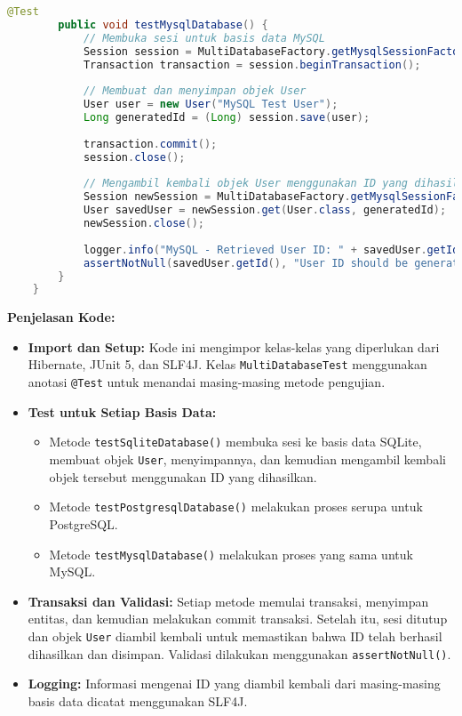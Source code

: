 \begin{lstlisting}[language=Java, style=JavaStyle]
		@Test
		public void testMysqlDatabase() {
			// Membuka sesi untuk basis data MySQL
			Session session = MultiDatabaseFactory.getMysqlSessionFactory().openSession();
			Transaction transaction = session.beginTransaction();
			
			// Membuat dan menyimpan objek User
			User user = new User("MySQL Test User");
			Long generatedId = (Long) session.save(user);
			
			transaction.commit();
			session.close();
			
			// Mengambil kembali objek User menggunakan ID yang dihasilkan
			Session newSession = MultiDatabaseFactory.getMysqlSessionFactory().openSession();
			User savedUser = newSession.get(User.class, generatedId);
			newSession.close();
			
			logger.info("MySQL - Retrieved User ID: " + savedUser.getId());
			assertNotNull(savedUser.getId(), "User ID should be generated in MySQL");
		}
	}
\end{lstlisting}

\textbf{Penjelasan Kode:}
\begin{itemize}
	\item \textbf{Import dan Setup:} Kode ini mengimpor kelas-kelas yang diperlukan dari Hibernate, JUnit 5, dan SLF4J. Kelas \texttt{MultiDatabaseTest} menggunakan anotasi \texttt{@Test} untuk menandai masing-masing metode pengujian.
	\item \textbf{Test untuk Setiap Basis Data:} 
	\begin{itemize}
		\item Metode \texttt{testSqliteDatabase()} membuka sesi ke basis data SQLite, membuat objek \texttt{User}, menyimpannya, dan kemudian mengambil kembali objek tersebut menggunakan ID yang dihasilkan.
		\item Metode \texttt{testPostgresqlDatabase()} melakukan proses serupa untuk PostgreSQL.
		\item Metode \texttt{testMysqlDatabase()} melakukan proses yang sama untuk MySQL.
	\end{itemize}
	\item \textbf{Transaksi dan Validasi:} Setiap metode memulai transaksi, menyimpan entitas, dan kemudian melakukan commit transaksi. Setelah itu, sesi ditutup dan objek \texttt{User} diambil kembali untuk memastikan bahwa ID telah berhasil dihasilkan dan disimpan. Validasi dilakukan menggunakan \texttt{assertNotNull()}.
	\item \textbf{Logging:} Informasi mengenai ID yang diambil kembali dari masing-masing basis data dicatat menggunakan SLF4J.
\end{itemize}

